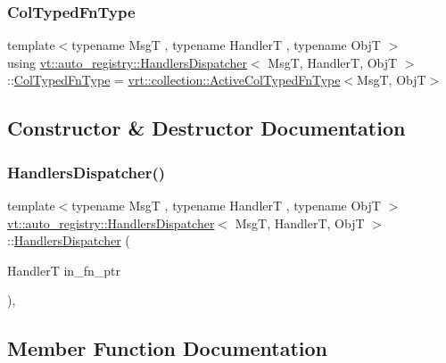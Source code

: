 \subsubsection{\texorpdfstring{Col\+Typed\+Fn\+Type}{ColTypedFnType}}
{\footnotesize\ttfamily template$<$typename MsgT , typename HandlerT , typename ObjT $>$ \\
using \hyperlink{structvt_1_1auto__registry_1_1_handlers_dispatcher}{vt\+::auto\+\_\+registry\+::\+Handlers\+Dispatcher}$<$ MsgT, HandlerT, ObjT $>$\+::\hyperlink{structvt_1_1auto__registry_1_1_handlers_dispatcher_ad45c828eebdd2a18ffc0aa64f542a85c}{Col\+Typed\+Fn\+Type} =  \hyperlink{namespacevt_1_1vrt_1_1collection_a939327f58a5838cf9d7dcc7f14d1670c}{vrt\+::collection\+::\+Active\+Col\+Typed\+Fn\+Type}$<$MsgT, ObjT$>$}



\subsection{Constructor \& Destructor Documentation}
\mbox{\label{structvt_1_1auto__registry_1_1_handlers_dispatcher_aea820469903ae2c06a6e9934d3e8d0cc}} 
\subsubsection{\texorpdfstring{Handlers\+Dispatcher()}{HandlersDispatcher()}}
{\footnotesize\ttfamily template$<$typename MsgT , typename HandlerT , typename ObjT $>$ \\
\hyperlink{structvt_1_1auto__registry_1_1_handlers_dispatcher}{vt\+::auto\+\_\+registry\+::\+Handlers\+Dispatcher}$<$ MsgT, HandlerT, ObjT $>$\+::\hyperlink{structvt_1_1auto__registry_1_1_handlers_dispatcher}{Handlers\+Dispatcher} (\begin{DoxyParamCaption}\item[{HandlerT}]{in\+\_\+fn\+\_\+ptr }\end{DoxyParamCaption})\hspace{0.3cm}{\ttfamily [inline]}, {\ttfamily [explicit]}}



\subsection{Member Function Documentation}
\mbox{\label{structvt_1_1auto__registry_1_1_handlers_dispatcher_a3139ff15aaf26b383dad67114c785b95}} 
